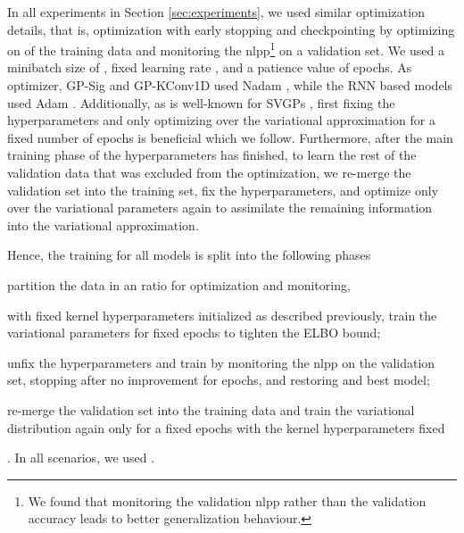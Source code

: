 \documentclass{article}
\begin{document}
In all experiments in Section \ref{sec:experiments}, we used similar optimization details, that is, optimization with early stopping and checkpointing by optimizing on  of the training data and monitoring the nlpp\footnote{We found that monitoring the validation nlpp rather than the validation accuracy leads to better generalization behaviour.} on a  validation set. We used a minibatch size of , fixed learning rate , and a patience value of  epochs.  As optimizer, GP-Sig and GP-KConv1D used Nadam \cite{Dozat2015IncorporatingNM}, while the RNN based models used Adam \cite{kingma2014adam}. Additionally, as is well-known for SVGPs \cite{bauer2016understanding}, first fixing the hyperparameters and only optimizing over the variational approximation for a fixed number of epochs is beneficial which we follow. Furthermore, after the main training phase of the hyperparameters has finished, to learn the rest of the validation data that was excluded from the optimization, we re-merge the validation set into the training set, fix the hyperparameters, and optimize only over the variational parameters again to assimilate the remaining information into the variational approximation.

Hence, the training for all models is split into the following phases \begin{enumerate*}[label=(\arabic*)] \item partition the data in an  ratio for optimization and monitoring, \item with fixed kernel hyperparameters initialized as described previously, train the variational parameters for fixed  epochs to tighten the ELBO bound; \item \label{enum:main_training_phase}  unfix the hyperparameters and train by monitoring the nlpp on the validation set, stopping after no improvement for  epochs, and restoring and best model; \item re-merge the validation set into the training data and train the variational distribution again only for a fixed  epochs with the kernel hyperparameters fixed \end{enumerate*}. In all scenarios, we used .
\end{document}
